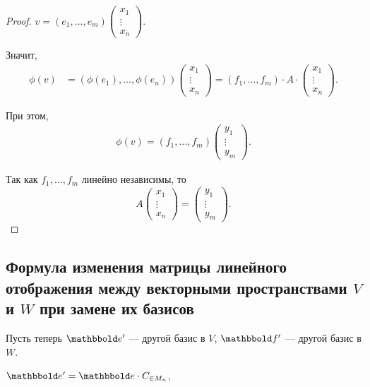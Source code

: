\begin{proof}
    $v = (e_1, \dots, e_m) \begin{pmatrix} x_1 \\ \vdots \\ x_n \end{pmatrix}$.

    Значит, 
    \begin{align*}
        \phi(v) &= (\phi(e_1), \dots, \phi(e_n)) \begin{pmatrix} x_1 \\ \vdots \\ x_n \end{pmatrix} = (f_1, \dots, f_m) \cdot A \cdot \begin{pmatrix} x_1 \\ \vdots \\ x_n \end{pmatrix}
    .\end{align*}

    При этом, 
    \begin{align*}
        \phi(v) = (f_1, \dots, f_m) \begin{pmatrix} y_1 \\ \vdots \\ y_m \end{pmatrix}
    .\end{align*}

    Так как $f_1, \dots, f_m$ линейно независимы, то
    \begin{equation*}
        A \begin{pmatrix} x_1 \\ \vdots \\ x_n \end{pmatrix} = \begin{pmatrix} y_1 \\ \vdots \\ y_m \end{pmatrix}
    .\end{equation*}
\end{proof}


\subsection{Формула изменения матрицы линейного отображения между векторными пространствами $V$ и $W$ при замене их базисов}

Пусть теперь $\E'$ --- другой базис в $V$, $\F'$ --- другой базис в $W$.

$\E' = \E \cdot C_{\in M_n}$,

